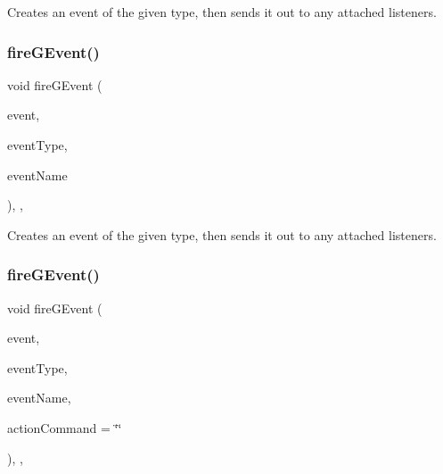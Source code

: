 Creates an event of the given type, then sends it out to any attached listeners. 

\mbox{\label{classsgl_1_1GObservable_abb0b2f66ba39211cb5d7615e9d1c04e2}} 
\subsubsection{\texorpdfstring{fire\+G\+Event()}{fireGEvent()}\hspace{0.1cm}{\footnotesize\ttfamily [3/8]}}
{\footnotesize\ttfamily void fire\+G\+Event (\begin{DoxyParamCaption}\item[{Q\+Key\+Event $\ast$}]{event,  }\item[{\mbox{\hyperlink{namespacesgl_a2628ea8d12e8b2563c32f05dc7fff6fa}{Event\+Type}}}]{event\+Type,  }\item[{const std\+::string \&}]{event\+Name }\end{DoxyParamCaption})\hspace{0.3cm}{\ttfamily [protected]}, {\ttfamily [virtual]}, {\ttfamily [inherited]}}



Creates an event of the given type, then sends it out to any attached listeners. 

\mbox{\label{classsgl_1_1GObservable_a119318675d2165bdf7dd853aaf881d4b}} 
\subsubsection{\texorpdfstring{fire\+G\+Event()}{fireGEvent()}\hspace{0.1cm}{\footnotesize\ttfamily [4/8]}}
{\footnotesize\ttfamily void fire\+G\+Event (\begin{DoxyParamCaption}\item[{Q\+Mouse\+Event $\ast$}]{event,  }\item[{\mbox{\hyperlink{namespacesgl_a2628ea8d12e8b2563c32f05dc7fff6fa}{Event\+Type}}}]{event\+Type,  }\item[{const std\+::string \&}]{event\+Name,  }\item[{const std\+::string \&}]{action\+Command = {\ttfamily \char`\"{}\char`\"{}} }\end{DoxyParamCaption})\hspace{0.3cm}{\ttfamily [protected]}, {\ttfamily [virtual]}, {\ttfamily [inherited]}}



